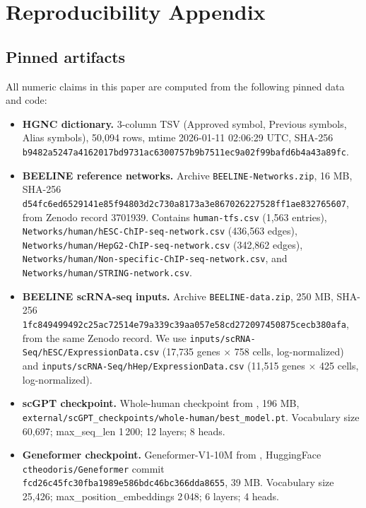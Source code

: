 
\appendix
\section{Reproducibility Appendix}
\label{app:repro}

\subsection{Pinned artifacts}

All numeric claims in this paper are computed from the following pinned
data and code:

\begin{itemize}
\item \textbf{HGNC dictionary.} 3-column TSV (Approved symbol, Previous
symbols, Alias symbols), 50{,}094 rows, mtime 2026-01-11 02:06:29 UTC,
SHA-256
\texttt{b9482a5247a4162017bd9731ac6300757b9b7511ec9a02f99bafd6b4a43a89fc}.
\item \textbf{BEELINE reference networks.} Archive
\texttt{BEELINE-Networks.zip}, 16 MB, SHA-256
\texttt{d54fc6ed6529141e85f94803d2c730a8173a3e867026227528ff1ae832765607},
from Zenodo record 3701939. Contains
\texttt{human-tfs.csv} (1{,}563 entries),
\texttt{Networks/human/hESC-ChIP-seq-network.csv} (436{,}563 edges),
\texttt{Networks/human/HepG2-ChIP-seq-network.csv} (342{,}862 edges),
\texttt{Networks/human/Non-specific-ChIP-seq-network.csv}, and
\texttt{Networks/human/STRING-network.csv}.
\item \textbf{BEELINE scRNA-seq inputs.} Archive
\texttt{BEELINE-data.zip}, 250 MB, SHA-256
\texttt{1fc849499492c25ac72514e79a339c39aa057e58cd272097450875cecb380afa},
from the same Zenodo record. We use
\texttt{inputs/scRNA-Seq/hESC/ExpressionData.csv} (17{,}735 genes
$\times$ 758 cells, log-normalized) and
\texttt{inputs/scRNA-Seq/hHep/ExpressionData.csv} (11{,}515 genes
$\times$ 425 cells, log-normalized).
\item \textbf{scGPT checkpoint.} Whole-human checkpoint from
\cite{cui2024scgpt}, 196 MB,
\texttt{external/scGPT\_checkpoints/whole-human/best\_model.pt}.
Vocabulary size 60{,}697; max\_seq\_len 1\,200; 12 layers; 8 heads.
\item \textbf{Geneformer checkpoint.} Geneformer-V1-10M from
\cite{theodoris2023geneformer}, HuggingFace
\texttt{ctheodoris/Geneformer} commit
\texttt{fcd26c45fc30fba1989e586bdc46bc366dda8655}, 39 MB. Vocabulary
size 25{,}426; max\_position\_embeddings 2\,048; 6 layers; 4 heads.
\end{itemize}

